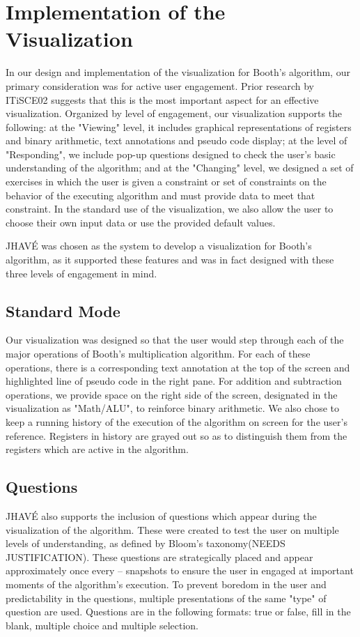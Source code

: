 \documentclass{acm_proc_article-sp}
\begin{document}
\section{Implementation of the Visualization}
In our design and implementation of the visualization for Booth's algorithm, our primary consideration was for active user engagement.
Prior research by ITiSCE02 suggests that this is the most important aspect for an effective visualization.\cite{tnaps:visengage}
Organized by level of engagement, our visualization supports the following: at the "Viewing" level, it includes graphical representations of registers and binary arithmetic, text annotations and pseudo code
 display; at the level of "Responding", we include pop-up questions designed to check the user's basic understanding of the algorithm; and at the "Changing" level, we designed a set of exercises in which the user is given a constraint or set of constraints on the behavior of the executing algorithm and must provide data to meet that constraint.
In the standard use of the visualization, we also allow the user to choose their own input data or use the provided default values.

JHAVÉ was chosen as the system to develop a visualization for Booth's algorithm, as it supported these features and was in fact designed with these three levels of engagement in mind.\cite{JHAVE}

\subsection{Standard Mode}
Our visualization was designed so that the user would step through each of the major operations of Booth's multiplication algorithm.
For each of these operations, there is a corresponding text annotation at the top of the screen and highlighted line of pseudo code in the right pane.
For addition and subtraction operations, we provide space on the right side of the screen, designated in the visualization as "Math/ALU", to reinforce binary arithmetic.
We also chose to keep a running history of the execution of the algorithm on screen for the user's reference.
Registers in history are grayed out so as to distinguish them from the registers which are active in the algorithm.
\subsection{Questions}
JHAVÉ also supports the inclusion of questions which appear during the visualization of the algorithm.
These were created to test the user on multiple levels of understanding, as defined by Bloom's taxonomy(NEEDS JUSTIFICATION).
These questions are strategically placed and appear approximately once every -- snapshots to ensure the user in engaged at important moments of the algorithm's execution.
To prevent boredom in the user and predictability in the questions, multiple presentations of the same "type" of question are used.
Questions are in the following formats: true or false, fill in the blank, multiple choice and multiple selection.
\end{document}
